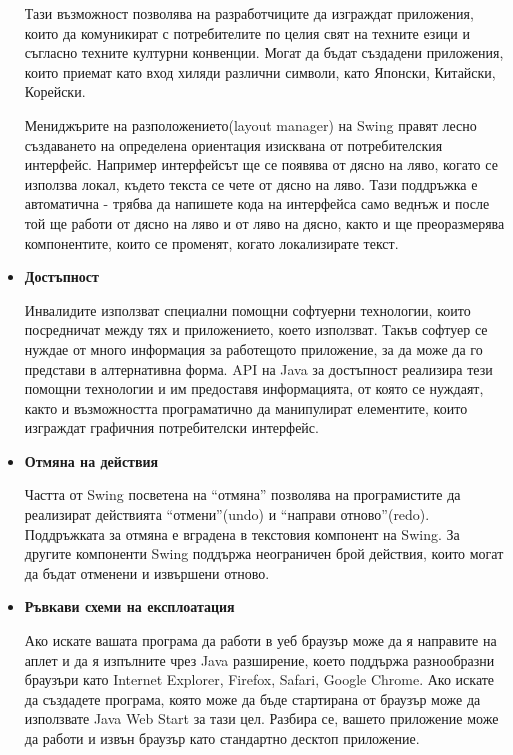 \begin{itemize}
    Тази възможност позволява на разработчиците да изграждат
    приложения, които да комуникират с потребителите по целия свят на
    техните езици и съгласно техните културни конвенции. Могат да
    бъдат създадени приложения, които приемат като вход хиляди
    различни символи, като Японски, Китайски, Корейски.

    Мениджърите на разположението(layout manager) на Swing правят
    лесно създаването на определена ориентация изисквана от
    потребителския интерфейс. Например интерфейсът ще се появява от
    дясно на ляво, когато се използва локал, където текста се чете от
    дясно на ляво. Тази поддръжка е автоматична - трябва да напишете
    кода на интерфейса само веднъж и после той ще работи от дясно на
    ляво и от ляво на дясно, както и ще преоразмерява компонентите,
    които се променят, когато локализирате текст.
  \item \textbf{Достъпност}

    Инвалидите използват специални помощни софтуерни технологии, които
    посредничат между тях и приложението, което използват. Такъв
    софтуер се нуждае от много информация за работещото приложение, за
    да може да го представи в алтернативна форма. API на Java за
    достъпност реализира тези помощни технологии и им предоставя
    информацията, от която се нуждаят, както и възможността
    програматично да манипулират елементите, които изграждат графичния
    потребителски интерфейс.
  \item \textbf{Отмяна на действия}

    Частта от Swing посветена на "`отмяна"' позволява на програмистите
    да реализират действията "`отмени"'(undo) и "`направи
    отново"'(redo). Поддръжката за отмяна е вградена в текстовия компонент
    на Swing. За другите компоненти Swing поддържа неограничен брой
    действия, които могат да бъдат отменени и извършени отново.
  \item \textbf{Ръвкави схеми на експлоатация}

    Ако искате вашата програма да работи в уеб браузър може да я
    направите на аплет и да я изпълните чрез Java разширение, което
    поддържа разнообразни браузъри като Internet Explorer, Firefox,
    Safari, Google Chrome. Ако искате да създадете програма, която
    може да бъде стартирана от браузър може да използвате Java Web
    Start за тази цел. Разбира се, вашето приложение може да работи и
    извън браузър като стандартно десктоп приложение.
\end{itemize}

